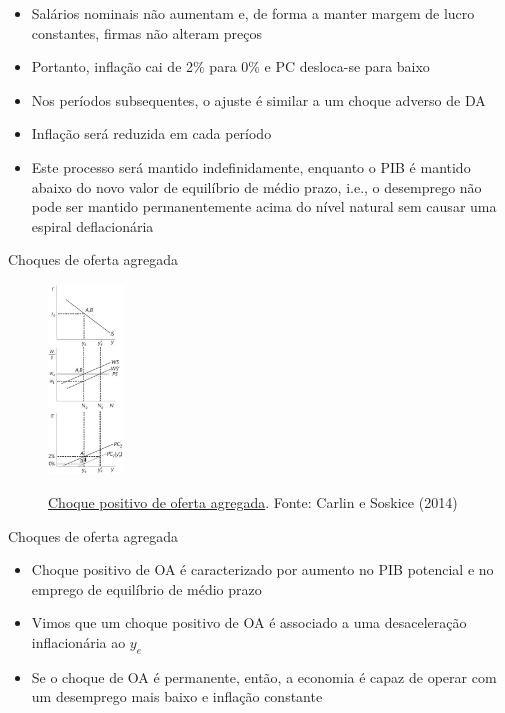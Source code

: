 \documentclass[10pt]{beamer}
\begin{document}
\begin{frame}
    \begin{itemize}
        \item Salários nominais não aumentam e, de forma a manter margem de lucro constantes, firmas não alteram preços\bigskip
        \item Portanto, inflação cai de 2\% para 0\% e PC desloca-se para baixo\bigskip
        \item Nos períodos subsequentes, o ajuste é similar a um choque adverso de DA\bigskip
        \item Inflação será reduzida em cada período\bigskip
        \item Este processo será mantido indefinidamente, enquanto o PIB é mantido abaixo do novo valor de equilíbrio de médio prazo, i.e., o desemprego não pode ser mantido permanentemente acima do nível natural sem causar uma espiral deflacionária
    \end{itemize}
\end{frame}

\begin{frame}
    {Choques de oferta agregada}
    \begin{figure}
        \href{https://bookdown.org/robohay/economicsnotes/Figures/Supply/supplyshock.jpg}{\includegraphics[width=0.18\textwidth]{./figures/aula14_fig6.jpg}}
        \caption{\href{https://bookdown.org/robohay/economicsnotes/Figures/Supply/supplyshock.jpg}{Choque positivo de oferta agregada}. Fonte: Carlin e Soskice (2014)}
    \end{figure}
\end{frame}

\begin{frame}
    {Choques de oferta agregada}
    \begin{itemize}
        \item Choque positivo de OA é caracterizado por aumento no PIB potencial e no emprego de equilíbrio de médio prazo\bigskip
        \item Vimos que um choque positivo de OA é associado a uma desaceleração inflacionária ao  $y_e$\bigskip
        \item Se o choque de OA é permanente, então, a economia é capaz de operar com um desemprego mais baixo e inflação constante
    \end{itemize}
\end{frame}
\end{document}
